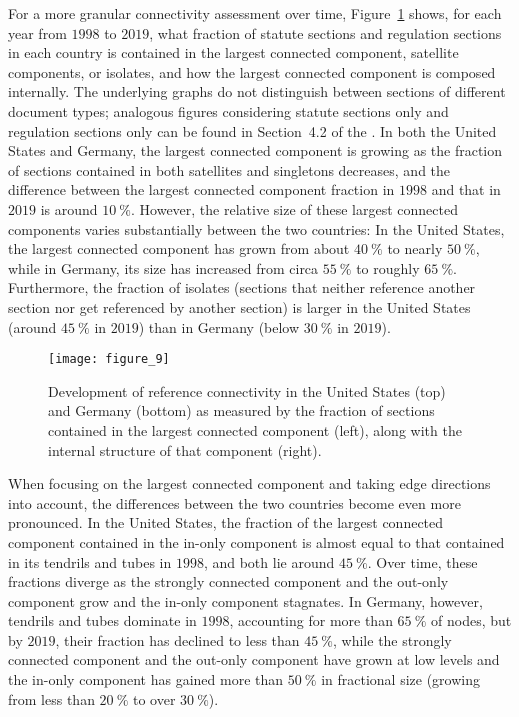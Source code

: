 For a more granular connectivity assessment over time, Figure~\ref{fig:connectivity-all} shows, for each year from $1998$ to $2019$, what fraction of statute sections and regulation sections in each country is contained in the largest connected component, satellite components, or isolates, 
and how the largest connected component is composed internally. 
The underlying graphs do not distinguish between sections of different document types; 
analogous figures considering statute sections only and regulation sections only can be found in Section~4.2 of the \thesi.
In both the United States and Germany, the largest connected component is growing as the fraction of sections contained in both satellites and singletons decreases, 
and the difference between the largest connected component fraction in $1998$ and that in $2019$ is around $10~\%$. 
However, the relative size of these largest connected components varies substantially between the two countries: 
In the United States, the largest connected component has grown from about $40~\%$ to nearly $50~\%$, 
while in Germany, its size has increased from circa $55~\%$ to roughly $65~\%$.
Furthermore, the fraction of isolates (sections that neither reference another section nor get referenced by another section) is larger in the United States (around $45~\%$ in $2019$) than in Germany (below $30~\%$ in $2019$).

\begin{figure}
	\centering
	\texttt{[image: figure\_9]}
	\caption{Development of reference connectivity in the United States (top) and Germany (bottom) as measured by the fraction of sections contained in the largest connected component (left), along with the internal structure of that component (right).}\label{fig:connectivity-all}
\end{figure}

When focusing on the largest connected component and taking edge directions into account, the differences between the two countries become even more pronounced.  
In the United States, the fraction of the largest connected component contained in the in-only component is almost equal to that contained in its tendrils and tubes in $1998$, and both lie around $45~\%$.
Over time, these fractions diverge as the strongly connected component and the out-only component grow and the in-only component stagnates. 
In Germany, however, tendrils and tubes dominate in $1998$, accounting for more than $65~\%$ of nodes, 
but by $2019$, their fraction has declined to less than $45~\%$, while the strongly connected component and the out-only component have grown at low levels and the in-only component has gained more than $50~\%$ in fractional size (growing from less than $20~\%$ to over $30~\%$).

